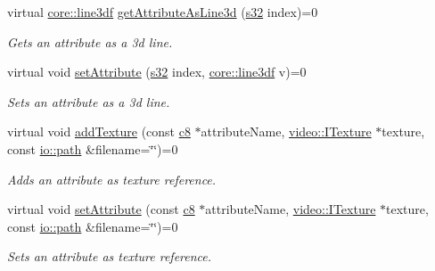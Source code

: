 \begin{DoxyCompactItemize}
virtual \hyperlink{namespaceirr_1_1core_acadb288f9aca3bf2d1222abcdf77114e}{core\+::line3df} \hyperlink{classirr_1_1io_1_1IAttributes_ab6cc3141c7d5bd82ade97c7da899d025}{get\+Attribute\+As\+Line3d} (\hyperlink{namespaceirr_ac66849b7a6ed16e30ebede579f9b47c6}{s32} index)=0
\begin{DoxyCompactList}\small\item\em Gets an attribute as a 3d line. \end{DoxyCompactList}\item 
\mbox{\label{classirr_1_1io_1_1IAttributes_ad39ffaf8f149906be60f9ef71dff9110}} 
virtual void \hyperlink{classirr_1_1io_1_1IAttributes_ad39ffaf8f149906be60f9ef71dff9110}{set\+Attribute} (\hyperlink{namespaceirr_ac66849b7a6ed16e30ebede579f9b47c6}{s32} index, \hyperlink{namespaceirr_1_1core_acadb288f9aca3bf2d1222abcdf77114e}{core\+::line3df} v)=0
\begin{DoxyCompactList}\small\item\em Sets an attribute as a 3d line. \end{DoxyCompactList}\item 
\mbox{\label{classirr_1_1io_1_1IAttributes_a3e2ee4641f97a67bd9be924d1e2b8f2c}} 
virtual void \hyperlink{classirr_1_1io_1_1IAttributes_a3e2ee4641f97a67bd9be924d1e2b8f2c}{add\+Texture} (const \hyperlink{namespaceirr_a9395eaea339bcb546b319e9c96bf7410}{c8} $\ast$attribute\+Name, \hyperlink{classirr_1_1video_1_1ITexture}{video\+::\+I\+Texture} $\ast$texture, const \hyperlink{namespaceirr_1_1io_a6468281622ce3a1c46b72e19f32dded5}{io\+::path} \&filename=\char`\"{}\char`\"{})=0
\begin{DoxyCompactList}\small\item\em Adds an attribute as texture reference. \end{DoxyCompactList}\item 
\mbox{\label{classirr_1_1io_1_1IAttributes_a8d7bd343b16d026b58ea2f5d175fd022}} 
virtual void \hyperlink{classirr_1_1io_1_1IAttributes_a8d7bd343b16d026b58ea2f5d175fd022}{set\+Attribute} (const \hyperlink{namespaceirr_a9395eaea339bcb546b319e9c96bf7410}{c8} $\ast$attribute\+Name, \hyperlink{classirr_1_1video_1_1ITexture}{video\+::\+I\+Texture} $\ast$texture, const \hyperlink{namespaceirr_1_1io_a6468281622ce3a1c46b72e19f32dded5}{io\+::path} \&filename=\char`\"{}\char`\"{})=0
\begin{DoxyCompactList}\small\item\em Sets an attribute as texture reference. \end{DoxyCompactList}\item 

\end{DoxyCompactItemize}
